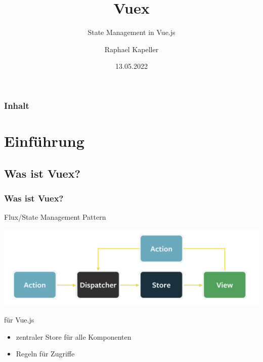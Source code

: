 \documentclass{beamer}
\title{Vuex}
\subtitle{State Management in Vue.js}
\author{Raphael Kapeller}
\date{13.05.2022}
\begin{document}
\begin{frame}
    \titlepage
\end{frame}
\begin{frame}
    \frametitle{Inhalt}
    \tableofcontents
\end{frame}

\section{Einführung}
\subsection{Was ist Vuex?}
\begin{frame}
    \frametitle{Was ist Vuex?}
    \begin{block}{Flux/State Management Pattern}
        \begin{center}
            \includegraphics[scale=0.3]{flux.png}
        \end{center}
    \end{block}
    \begin{block}{für Vue.js}
        \begin{itemize}
            \item zentraler Store für alle Komponenten
            \item Regeln für Zugriffe
        \end{itemize}
    \end{block}
\end{frame}
\end{document}
